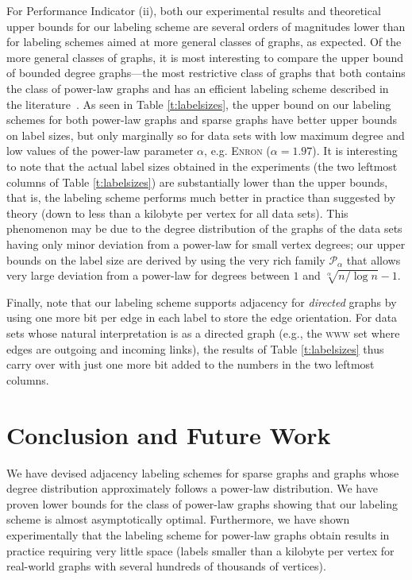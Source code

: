 \documentclass{article}
\theoremstyle{remark}
\newcommand{\PLB}{\ensuremath{ \mathcal{P}_{\alpha}}}
\begin{document}
For Performance Indicator (ii), both our experimental results and theoretical upper bounds for our labeling scheme are several orders of magnitudes lower than for labeling schemes aimed at more general classes of graphs, as expected. Of the more general classes of graphs, it is most interesting to compare the upper bound of bounded degree graphs---the most restrictive class of graphs that both contains the class of power-law graphs and has an efficient labeling scheme described in the literature~\cite{adjiashvili2014labeling}. As seen in Table \ref{t:labelsizes}, the upper bound on our labeling schemes for both power-law graphs and sparse graphs have better upper bounds on label sizes, but only marginally so for data sets with low maximum degree and low values of the power-law parameter $\alpha$, e.g. \textsc{Enron} ($\alpha = 1.97$). 
It is interesting to note that the actual label sizes obtained in the experiments (the two leftmost columns of Table \ref{t:labelsizes}) are substantially lower than the upper bounds, that is,
the labeling scheme performs much better in practice than suggested by theory (down to less than a kilobyte per vertex for all data sets). This phenomenon may be due to the degree distribution of the graphs of the data sets having only minor deviation from a power-law for small vertex degrees; our upper bounds on the label size are derived by using the very rich family $\PLB$ that allows very large deviation from a power-law for degrees between $1$ and $\sqrt[\alpha]{n/\log n} - 1$.

Finally, note that our labeling scheme supports adjacency for \emph{directed} graphs by using one more bit per edge in each label to store the edge orientation. For data sets whose natural interpretation is as a directed graph (e.g., the \textsc{www} set where edges are outgoing and incoming links), the results of Table \ref{t:labelsizes} thus carry over with just one more bit
added to the numbers in the two leftmost columns.

\section{Conclusion and Future Work}

We have devised adjacency labeling schemes for sparse graphs and graphs whose degree distribution approximately follows a power-law distribution. We have proven lower bounds for the class of power-law graphs showing that our labeling scheme is  almost asymptotically optimal. Furthermore, we have shown experimentally that the labeling scheme for power-law graphs obtain
results in practice requiring very little space (labels smaller than a kilobyte per vertex for real-world graphs with several hundreds of thousands of vertices).
\end{document}
